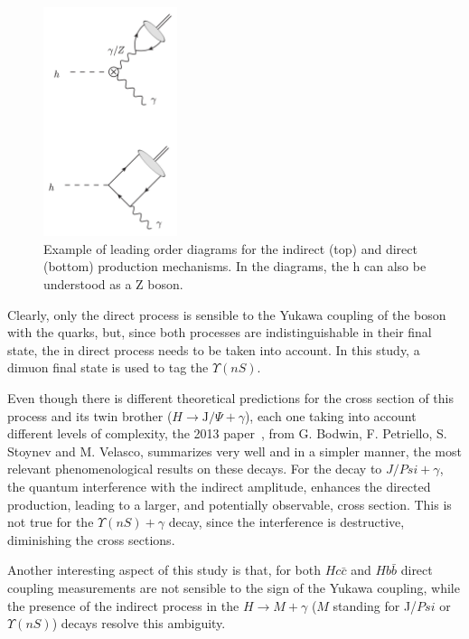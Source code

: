 \begin{figure}[!htbp]
  \begin{center}
  \includegraphics[width=0.35\textwidth ]{figures_and_tables/theory/direct_indirect.png}
  \end{center}\vspace*{-.5cm}
  \caption{Example of leading order diagrams for the indirect (top) and direct (bottom) production mechanisms. In the diagrams, the h can also be understood as a Z boson.}
  \label{direct_indirect}
  \end{figure} 

Clearly, only the direct process is sensible to the Yukawa coupling of the boson with the quarks, but, since both processes are indistinguishable in their final state, the in direct process needs to be taken into account. In this study, a dimuon final state is used to tag the $\Upsilon(nS)$.

Even though there is different theoretical predictions for the cross section of this process and its twin brother ($H \rightarrow \text{J/}\Psi + \gamma$), each one taking into account different levels of complexity, the 2013 paper~\cite{PhysRevD.88.053003}, from G. Bodwin, F. Petriello, S. Stoynev and M. Velasco, summarizes very well and in a simpler manner, the most relevant phenomenological results on these decays. For the decay to $J/Psi + \gamma$, the quantum interference with the indirect amplitude, enhances the directed production, leading to a larger, and potentially observable, cross section. This is not true for the $\Upsilon(nS) + \gamma$ decay, since the interference is destructive, diminishing the cross sections. 

Another interesting aspect of this study is that, for both $Hc\bar{c}$ and $Hb\bar{b}$ direct coupling measurements are not sensible to the sign of the Yukawa coupling, while the presence of the indirect process in the $H \rightarrow M + \gamma$ ($M$ standing for J/$Psi$ or $\Upsilon(nS)$) decays resolve this ambiguity.


